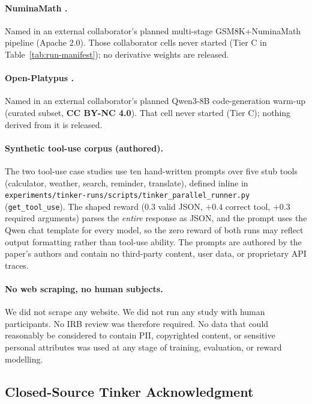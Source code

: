 \paragraph{NuminaMath \cite{li2024numinamath}.}
Named in an external collaborator's planned multi-stage
GSM8K+NuminaMath pipeline (Apache 2.0). Those collaborator cells never
started (Tier C in Table~\ref{tab:run-manifest}); no derivative weights are
released.

\paragraph{Open-Platypus \cite{lee2023platypus}.}
Named in an external collaborator's planned Qwen3-8B code-generation
warm-up (curated subset, \textbf{CC BY-NC 4.0}). That cell never started
(Tier C); nothing derived from it is released.

\paragraph{Synthetic tool-use corpus (authored).}
The two tool-use case studies use ten hand-written prompts over five
stub tools (calculator, weather, search, reminder, translate), defined
inline in \texttt{experiments/tinker-runs/scripts/tinker\_parallel\_runner.py}
(\texttt{get\_tool\_use}). The shaped reward (0.3 valid JSON, $+0.4$ correct
tool, $+0.3$ required arguments) parses the \emph{entire} response as JSON,
and the prompt uses the Qwen chat template for every model, so the zero
reward of both runs may reflect output formatting rather than tool-use
ability. The prompts are authored by the paper's authors and contain no
third-party content, user data, or proprietary API traces.

\paragraph{No web scraping, no human subjects.}
We did not scrape any website. We did not run any study with human
participants. No IRB review was therefore required. No data that could
reasonably be considered to contain PII, copyrighted content, or sensitive
personal attributes was used at any stage of training, evaluation, or
reward modelling.

\subsection{Closed-Source Tinker Acknowledgment}
\label{sec:tinker_closed}

